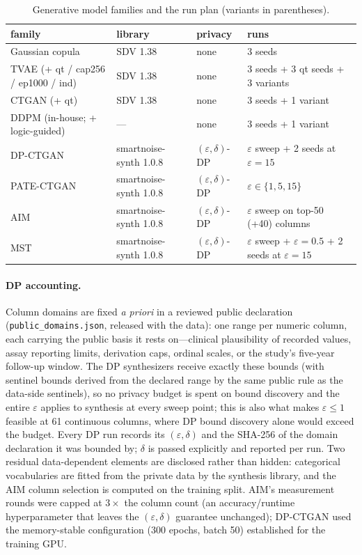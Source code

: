 \documentclass[11pt,a4paper]{article}
\newcommand{\eps}{\ensuremath{\varepsilon}}
\begin{document}
\begin{table}[htbp]
\centering
\caption{Generative model families and the run plan (variants in parentheses).}
\label{tab:runplan}
\footnotesize
\setlength{\tabcolsep}{4pt}
\begin{tabular}{llll}
\toprule
family & library & privacy & runs \\
\midrule
Gaussian copula & SDV 1.38 & none & 3 seeds \\
TVAE (+ qt / cap256 / ep1000 / ind) & SDV 1.38 & none & 3 seeds + 3 qt seeds + 3 variants \\
CTGAN (+ qt) & SDV 1.38 & none & 3 seeds + 1 variant \\
DDPM (in-house; + logic-guided) & --- & none & 3 seeds + 1 variant \\
DP-CTGAN & smartnoise-synth 1.0.8 & $(\eps,\delta)$-DP & \eps{} sweep + 2 seeds at $\eps{=}15$ \\
PATE-CTGAN & smartnoise-synth 1.0.8 & $(\eps,\delta)$-DP & $\eps \in \{1, 5, 15\}$ \\
AIM & smartnoise-synth 1.0.8 & $(\eps,\delta)$-DP & \eps{} sweep on top-50 (+40) columns \\
MST & smartnoise-synth 1.0.8 & $(\eps,\delta)$-DP & \eps{} sweep + $\eps{=}0.5$ + 2 seeds at $\eps{=}15$ \\
\bottomrule
\end{tabular}
\end{table}

\paragraph{DP accounting.} Column domains are fixed \emph{a priori} in a reviewed
public declaration (\texttt{public\_domains.json}, released with the data): one
range per numeric column, each carrying the public basis it rests on---clinical
plausibility of recorded values, assay reporting limits, derivation caps, ordinal
scales, or the study's five-year follow-up window. The DP synthesizers receive
exactly these bounds (with sentinel bounds derived from the declared range by the
same public rule as the data-side sentinels), so no privacy budget is spent on
bound discovery and the entire \eps{} applies to synthesis at every sweep point;
this is also what makes $\eps \leq 1$ feasible at 61 continuous columns, where DP
bound discovery alone would exceed the budget. Every DP run records its
$(\eps, \delta)$ and the SHA-256 of the domain declaration it was bounded by;
$\delta$ is passed explicitly and reported per run. Two residual data-dependent
elements are disclosed rather than hidden: categorical vocabularies are fitted from
the private data by the synthesis library, and the AIM column selection is computed
on the training split. AIM's measurement rounds were capped at $3\times$ the column
count (an accuracy/runtime hyperparameter that leaves the $(\eps, \delta)$
guarantee unchanged); DP-CTGAN used the memory-stable configuration (300 epochs,
batch 50) established for the training GPU.
\end{document}
